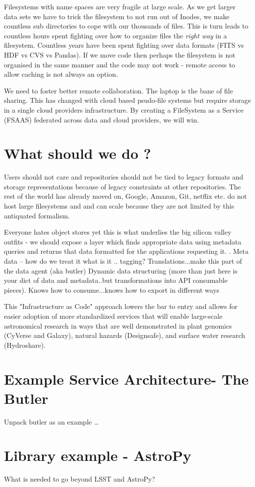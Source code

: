 Filesystems with name spaces are very fragile at large scale. As we get larger data sets we have to trick the filesystem to not run out of Inodes, we make countless sub directories to cope with our thousands of files.
This is turn leads to countless hours spent fighting over how to organize files  the \emph{right way} in a filesystem.
Countless years have been spent fighting over data formats (FITS vs HDF vs CVS vs Pandas).
If we move code then perhaps the filesystem is not organised in the same manner and the code may not work - remote access to allow caching is not always an option.

We need to foster better remote collaboration.  The laptop is the bane of file sharing.
This has changed with cloud based psudo-file systems but require storage in a single 
cloud providers infrastructure. By creating a FileSystem as a Service (FSAAS) federated
across data and cloud providers, we will win.


\section{What should  we do ?}
Users should not care and repositories should not be tied to legacy formats  and storage representations because of legacy constraints  at other repositories.
The rest of the world has already moved on,  Google, Amazon, Git, netflix etc. do not host large filesystems and and can scale because they are not limited by this antiquated formalism.

Everyone hates object stores  yet this is what underlies the big silicon valley outfits - we should expose a layer which finds appropriate data using metadata queries and returns that data formatted for the applications requesting it.
.
Meta data -- how do we treat it what is it ..  tagging?  Translations...make this part of the data agent (aka butler)
Dynamic data structuring (more than just here is your dict of data and metadata..but transformations into API consumable pieces).  Knows how to consume...knows how to export in different ways

This "Infrastructure as Code" \citep{morris2016infrastructure} approach lowers the bar to entry
and allows for easier adoption of more standardized services that will enable large-scale
astronomical research in ways that are well demonstrated in plant genomics (CyVerse and Galaxy), natural hazards (Designsafe), and surface water research (Hydroshare).


\section{Example Service Architecture- The Butler}
Unpack butler as an example …

\section{Library example - AstroPy}
What is needed to go beyond LSST and AstroPy?


